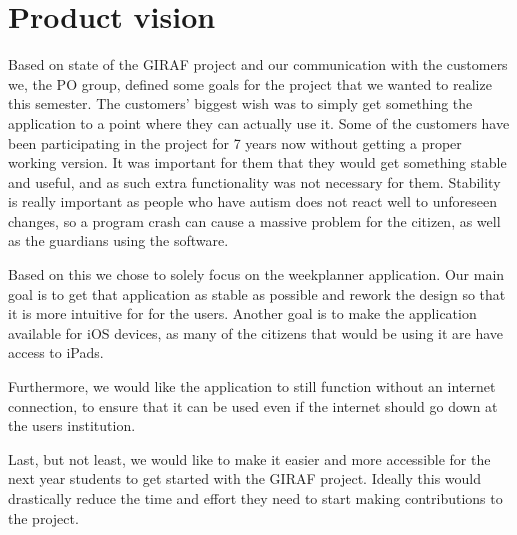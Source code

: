 \section{Product vision}
Based on state of the GIRAF project and our communication with the customers we, the PO group, defined some goals for the project that we wanted to realize this semester.
The customers' biggest wish was to simply get something the application to a point where they can actually use it.
Some of the customers have been participating in the project for 7 years now without getting a proper working version.
It was important for them that they would get something stable and useful, and as such extra functionality was not necessary for them.
Stability is really important as people who have autism does not react well to unforeseen changes, so a program crash can cause a massive problem for the citizen, as well as the guardians using the software.

Based on this we chose to solely focus on the weekplanner application.
Our main goal is to get that application as stable as possible and rework the design so that it is more intuitive for for the users.
Another goal is to make the application available for iOS devices, as many of the citizens that would be using it are have access to iPads.

Furthermore, we would like the application to still function without an internet connection, to ensure that it can be used even if the internet should go down at the users institution.

Last, but not least, we would like to make it easier and more accessible for the next year students to get started with the GIRAF project.
Ideally this would drastically reduce the time and effort they need to start making contributions to the project.